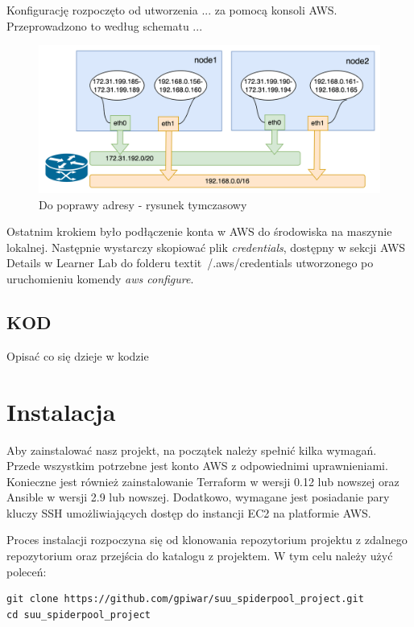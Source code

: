 \documentclass[onecolumn,12pt]{article}
\begin{document}
Konfigurację rozpoczęto od utworzenia  ...  za pomocą konsoli AWS. 
Przeprowadzono to według schematu ... 

\begin{figure}
    \centering
    \includegraphics[width=0.8\linewidth]{alicloud-k8s-network_NOT_OURS.png}
    \caption{Do poprawy adresy - rysunek tymczasowy}
    \label{fig:enter-label}
\end{figure}

Ostatnim krokiem było podłączenie konta w AWS do środowiska na maszynie lokalnej. Następnie wystarczy skopiować plik \textit{credentials}, dostępny w  sekcji AWS Details w Learner Lab do folderu textit{~/.aws/credentials} utworzonego po uruchomieniu komendy \textit{aws configure}.

\subsection{KOD}

Opisać co się dzieje w kodzie 


\section{Instalacja}

Aby zainstalować nasz projekt, na początek należy spełnić kilka wymagań. Przede wszystkim 
potrzebne jest konto AWS z odpowiednimi uprawnieniami. Konieczne jest również zainstalowanie
Terraform w wersji 0.12 lub nowszej oraz Ansible w wersji 2.9 lub nowszej. Dodatkowo, wymagane
jest posiadanie pary kluczy SSH umożliwiających dostęp do instancji EC2 na platformie AWS.

Proces instalacji rozpoczyna się od klonowania repozytorium projektu z zdalnego repozytorium 
oraz przejścia do katalogu z projektem. W tym celu należy użyć poleceń:

\begin{verbatim}
git clone https://github.com/gpiwar/suu_spiderpool_project.git
cd suu_spiderpool_project
\end{verbatim}
\end{document}
